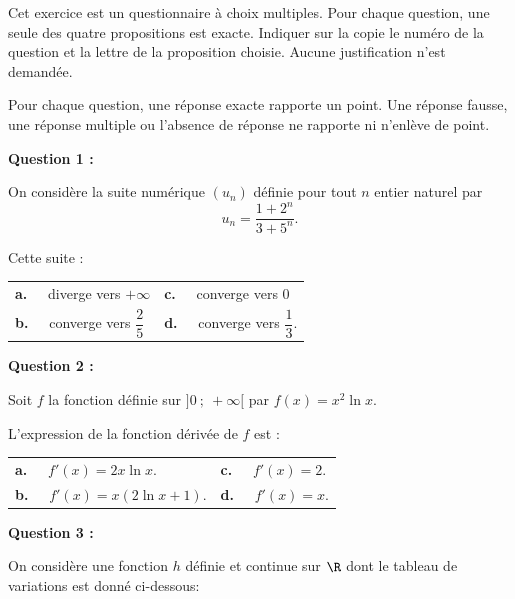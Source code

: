 \medskip

Cet exercice est un questionnaire à choix multiples.
Pour chaque question, une seule des quatre propositions est exacte.
Indiquer sur la copie le numéro de la question et la lettre de la proposition choisie.
Aucune justification n'est demandée.

\smallskip

Pour chaque question, une réponse exacte rapporte un point. Une réponse fausse, une réponse multiple ou l'absence de réponse ne rapporte ni n'enlève de point.

\bigskip

\textbf{Question 1 :}

\medskip

On considère la suite numérique $\left(u_n\right)$ définie pour tout $n$ entier naturel par 
\[u_n = \dfrac{1 + 2^n}{3 + 5^n}.\]

Cette suite :

\smallskip

\begin{tabularx}{\linewidth}{X X}
\textbf{a.~~} diverge vers $+\infty$ &\textbf{c.~~} converge vers 0\\
\textbf{b.~~} converge vers $\dfrac25$ &\textbf{d.~~} converge vers $\dfrac13$.
\end{tabularx}

\medskip

\textbf{Question 2 :}

\medskip

Soit $f$ la fonction définie sur $]0~;~ +\infty[$ par $f(x) = x^2\ln x$.

L'expression de la fonction dérivée de $f$ est :

\smallskip

\begin{tabularx}{\linewidth}{X X}
\textbf{a.~~} $f'(x) = 2x\ln x$.&\textbf{c.~~} $f'(x) = 2$.\\
\textbf{b.~~} $f'(x) = x(2\ln x + 1)$.&\textbf{d.~~} $f'(x) = x$.
\end{tabularx}

\medskip

\textbf{Question 3 :}

\medskip

On considère une fonction $h$ définie et continue sur $\R$ dont le tableau de variations est donné ci-dessous:












